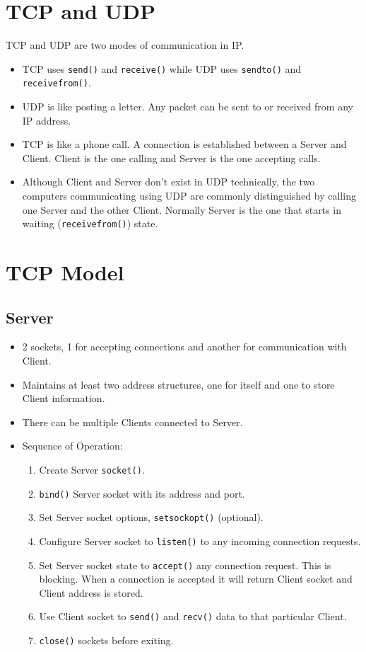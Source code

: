 \documentclass[12pt,a4paper]{article}
\begin{document}
\section{TCP and UDP}
TCP and UDP are two modes of communication in IP.
\begin{itemize}
\item TCP uses \verb|send()| and \verb|receive()| while UDP uses \verb|sendto()| and \verb|receivefrom()|.
\item UDP is like posting a letter. Any packet can be sent to or received from any IP address. 
\item TCP is like a phone call. A connection is established between a Server and Client. Client is the one calling and Server is the one accepting calls.
\item Although Client and Server don't exist in UDP technically, the two computers communicating using UDP are commonly distinguished by calling one Server and the other Client. Normally Server is the one that starts in waiting (\verb|receivefrom()|) state.
\end{itemize}
\section{TCP Model}
\subsection{Server}
\begin{itemize}
\item 2 sockets, 1 for accepting connections and another for communication with  Client.
\item Maintains at least two address structures, one for itself and one to store Client information. 
\item There can be multiple Clients connected to Server.
\item Sequence of Operation:
	\begin{enumerate}
    \item Create Server \verb|socket()|.
    \item \verb|bind()| Server socket with its address and port.
    \item Set Server socket options, \verb|setsockopt()| (optional).
    \item Configure Server socket to \verb|listen()| to any incoming connection requests.
    \item Set Server socket state to \verb|accept()| any connection request. This is blocking. When a connection is accepted it will return Client socket and Client address is stored.
    \item Use Client socket to \verb|send()| and \verb|recv()| data to that particular Client.
    \item \verb|close()| sockets before exiting.
	\end{enumerate}
\end{itemize}
\end{document}
